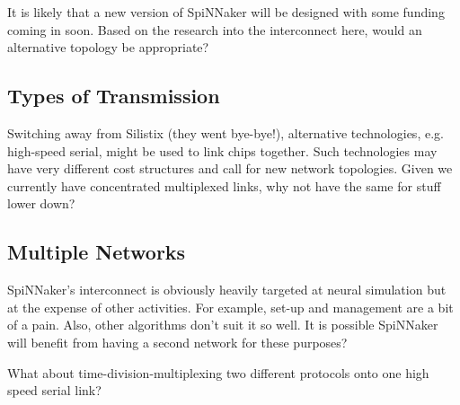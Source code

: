 		It is likely that a new version of SpiNNaker will be designed with some
		funding coming in soon. Based on the research into the interconnect here,
		would an alternative topology be appropriate?
		
		\subsection{Types of Transmission}
			
			Switching away from Silistix (they went bye-bye!), alternative
			technologies, e.g. high-speed serial, might be used to link chips
			together. Such technologies may have very different cost structures and
			call for new network topologies. Given we currently have concentrated
			multiplexed links, why not have the same for stuff lower down?
		
		\subsection{Multiple Networks}
			
			SpiNNaker's interconnect is obviously heavily targeted at neural
			simulation but at the expense of other activities. For example, set-up and
			management are a bit of a pain. Also, other algorithms don't suit it so
			well. It is possible SpiNNaker will benefit from having a second network
			for these purposes?
			
			What about time-division-multiplexing two different protocols onto one
			high speed serial link?

